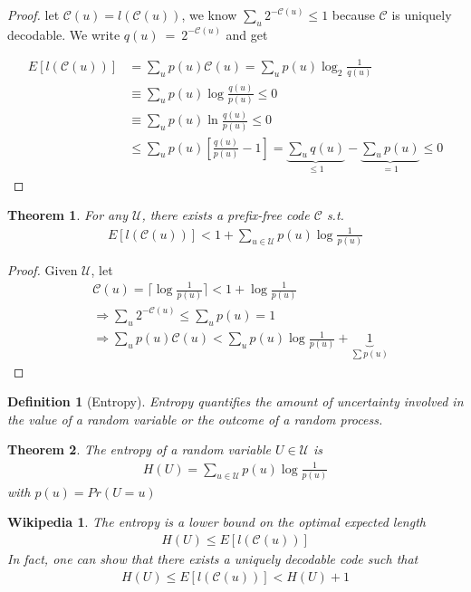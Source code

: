 \documentclass[twoside]{article}
\newtheorem{theorem}{Theorem}[section]
\newtheorem*{wikipedia}{Wikipedia}
\newtheorem{definition}{Definition}[section]
\theoremstyle{definition} %
\def\U{\mathcal{U}}
\def\C{\mathcal{C}}
\begin{document}
\begin{proof}
  let $\C(u) = l(\C(u))$, we know $\sum_u 2^{-\C(u)} \leq 1$ because $\C$ is uniquely decodable. We write $q(u)~=~2^{-\C(u)}$ and get

  \begin{align*}
    E[l(\C(u))] &= \sum_u p(u) \C(u) = \sum_u p(u) \log_2\frac{1}{q(u)} \\
    &\equiv \sum_u p(u) \log\frac{q(u)}{p(u)} \leq 0 \\
    &\equiv \sum_u p(u) \ln\frac{q(u)}{p(u)} \leq 0 \\
    &\leq \sum_u p(u) \left[\frac{q(u)}{p(u)} - 1\right]
    = \underbrace{\sum_u q(u)}_{\leq 1} - \underbrace{\sum_u p(u)}_{=1} \leq 0
  \end{align*}
\end{proof}

\begin{theorem}
  For any $\U$, there exists a prefix-free code $\C$ s.t.
  \begin{align*}
    E[l(\C(u))] < 1 + \sum_{u \in \U} p(u) \log\frac{1}{p(u)}
  \end{align*}
\end{theorem}
\begin{proof}
  Given $\U$, let
  \begin{align*}
    &\C(u) = \lceil \log\frac{1}{p(u)} \rceil < 1 + \log \frac{1}{p(u)} \\
    &\Rightarrow \sum_u 2^{-\C(u)} \leq \sum_u p(u) = 1 \\
    &\Rightarrow \sum_u p(u) \C(u) < \sum_u p(u) \log \frac{1}{p(u)} + \underbrace{1}_{\sum p(u)}
  \end{align*}
\end{proof}

\begin{definition}[Entropy]
  Entropy quantifies the amount of uncertainty involved in the value of a random variable or the outcome of a random process.
\end{definition}

\begin{theorem}
  The entropy of a random variable $U \in \U$ is
  \begin{align*}
    H(U) = \sum_{u \in \U} p(u) \log \frac{1}{p(u)}
  \end{align*}
  with $p(u) = Pr(U = u)$
\end{theorem}

\begin{wikipedia}
  The entropy is a lower bound on the optimal expected length
  \begin{align*}
    H(U) \leq E[l(\C(u))]
  \end{align*}
  In fact, one can show that there exists a uniquely decodable code such that
  \begin{align*}
     H(U) \leq E[l(\C(u))] < H(U) + 1
   \end{align*}
\end{wikipedia}
\end{document}
